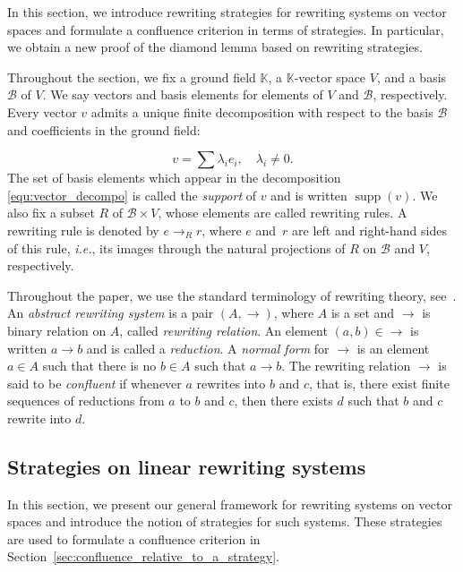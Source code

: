 \documentclass[10pt]{easychair}
\theoremstyle{definition}
\newcommand\ie{\emph{i.e.}}
\DeclareMathOperator{\supp}{supp}
\newcommand\basis{\mathscr{B}}
\newcommand\K{\mathbb{K}}
\newcommand\rewR{\to_R}
\begin{document}
In this section, we introduce rewriting strategies for rewriting systems
on vector spaces and formulate a confluence criterion in terms of
strategies. In particular, we obtain a new proof of the diamond lemma
based on rewriting strategies.
\medskip

Throughout the section, we fix a ground field $\K$, a $\K$-vector space
$V$, and a basis $\basis$ of $V$. We say vectors and basis elements for
elements of $V$ and $\basis$, respectively. Every vector $v$ admits a
unique finite decomposition with respect to the basis $\basis$ and
coefficients in the ground field:

\begin{equation}\label{equ:vector_decompo}
  v=\sum\lambda_ie_i,\quad\lambda_i\neq 0.
\end{equation}
The set of basis elements which appear in the decomposition
\eqref{equ:vector_decompo} is called the {\it support} of $v$ and is
written $\supp(v)$. We also fix a subset $R$ of $\basis\times V$, whose
elements are called rewriting rules. A rewriting rule is denoted by
$e\rewR r$, where $e$ and~$r$ are left and right-hand sides of this rule,
\ie, its images through the natural projections of $R$ on $\basis$ and
$V$, respectively.
\medskip

Throughout the paper, we use the standard terminology of rewriting
theory, see~\cite{MR1629216}. An {\em abstract rewriting system} is a
pair $(A,\to)$, where $A$ is a set and $\to$ is binary relation on $A$,
called {\em rewriting relation}. An element $(a,b)\in\to$ is written
$a\to b$ and is called a {\em reduction}. A {\em normal form} for $\to$
is an element $a\in A$ such that there is no $b\in A$ such that $a\to b$.
The rewriting relation $\to$ is said to be {\em confluent} if whenever
$a$ rewrites into $b$ and $c$, that is, there exist finite sequences of
reductions from $a$ to $b$ and $c$, then there exists $d$ such that $b$
and $c$ rewrite into $d$. 

\subsection{Strategies on linear rewriting systems}
\label{sec:strategies_on_linear_rewriting_systems}

In this section, we present our general framework for rewriting systems
on vector spaces and introduce the notion of strategies for such systems.
These strategies are used to formulate a confluence criterion in 
Section~\ref{sec:confluence_relative_to_a_strategy}.
\medskip
\end{document}
